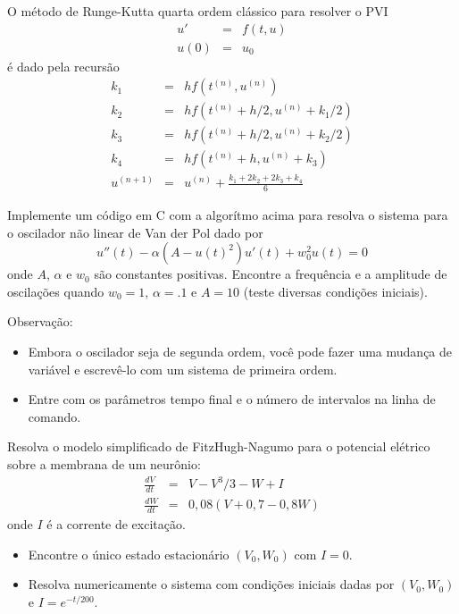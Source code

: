 \begin{exer}\label{edo1}O método de Runge-Kutta quarta ordem clássico para resolver o PVI
\begin{eqnarray*}
u'&=&f(t,u)\\
u(0)&=&u_0
\end{eqnarray*}
é dado pela recursão
\begin{eqnarray*}
k_1&=&hf\left(t^{(n)},u^{(n)}\right)\\
k_2&=&hf\left(t^{(n)}+h/2,u^{(n)}+k_1/2\right)\\
k_3&=&hf\left(t^{(n)}+h/2,u^{(n)}+k_2/2\right)\\
k_4&=&hf\left(t^{(n)}+h,u^{(n)}+k_3\right)\\
u^{(n+1)}&=&u^{(n)}+\frac{k_1+2k_2+2k_3+k_4}{6}
\end{eqnarray*}

Implemente um código em C com a algorítmo acima para resolva o sistema para o oscilador não linear de Van der Pol dado por
\begin{equation} u''(t) - \alpha (A-u(t)^2)u'(t) + w_0^2u(t)=0 \end{equation}
onde $A$, $\alpha$ e $w_0$ são constantes positivas. Encontre a frequência e a amplitude de oscilações quando $w_0=1$, $\alpha=.1$ e $A=10$ (teste diversas condições iniciais).

Observação: 
\begin{itemize}
 \item Embora o oscilador seja de segunda ordem, você pode fazer uma mudança de variável e escrevê-lo com um sistema de primeira ordem.
 \item Entre com os parâmetros tempo final e o número de intervalos na linha de comando.
\end{itemize}

\end{exer}

\begin{exer}\label{edo2}Resolva o modelo simplificado de FitzHugh-Nagumo para o potencial elétrico sobre a membrana de um neurônio:
\begin{eqnarray*}
\frac{d V}{dt}& = &  V-V^3/3 - W +  I  \\
\frac{d W}{dt} & = & 0,08(V+0,7 - 0,8W)
\end{eqnarray*}
onde $I$ é a corrente de excitação. 
\begin{itemize}
\item Encontre o único estado estacionário $\left(V_0,W_0\right)$ com $I=0$.
\item Resolva numericamente o sistema com condições iniciais dadas por $\left(V_0,W_0\right)$ e $I=e^{-t/200}$.
\end{itemize}
\end{exer}